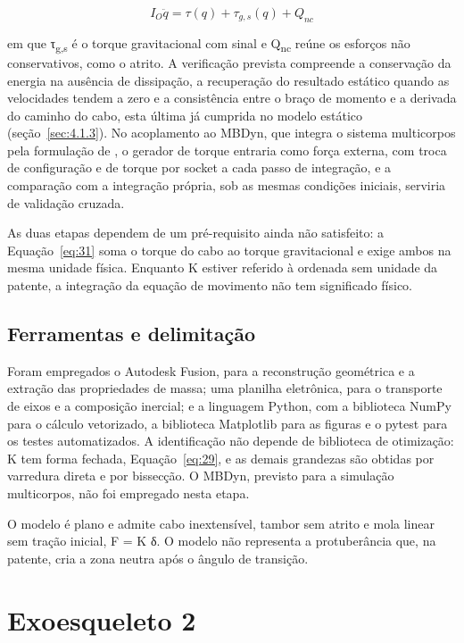 \begin{equation}
  I_{O}\ddot{q} = \tau(q) + \tau_{g,s}(q) + Q_{nc}
  \label{eq:31}
\end{equation}

em que τ\textsubscript{g,s} é o torque gravitacional com sinal e Q\textsubscript{nc} reúne os esforços não conservativos, como o atrito. A verificação prevista compreende a conservação da energia na ausência de dissipação, a recuperação do resultado estático quando as velocidades tendem a zero e a consistência entre o braço de momento e a derivada do caminho do cabo, esta última já cumprida no modelo estático (seção~\ref{sec:4.1.3}). No acoplamento ao MBDyn, que integra o sistema multicorpos pela formulação de \textcite{masarati2014}, o gerador de torque entraria como força externa, com troca de configuração e de torque por socket a cada passo de integração, e a comparação com a integração própria, sob as mesmas condições iniciais, serviria de validação cruzada.

As duas etapas dependem de um pré-requisito ainda não satisfeito: a Equação~\eqref{eq:31} soma o torque do cabo ao torque gravitacional e exige ambos na mesma unidade física. Enquanto K estiver referido à ordenada sem unidade da patente, a integração da equação de movimento não tem significado físico.

\subsection{Ferramentas e delimitação}\label{sec:3.1.14}

Foram empregados o Autodesk Fusion, para a reconstrução geométrica e a extração das propriedades de massa; uma planilha eletrônica, para o transporte de eixos e a composição inercial; e a linguagem Python, com a biblioteca NumPy \cite{harris2020} para o cálculo vetorizado, a biblioteca Matplotlib \cite{hunter2007} para as figuras e o pytest para os testes automatizados. A identificação não depende de biblioteca de otimização: K tem forma fechada, Equação~\eqref{eq:29}, e as demais grandezas são obtidas por varredura direta e por bissecção. O MBDyn, previsto para a simulação multicorpos, não foi empregado nesta etapa.

O modelo é plano e admite cabo inextensível, tambor sem atrito e mola linear sem tração inicial, F = K δ. O modelo não representa a protuberância que, na patente, cria a zona neutra após o ângulo de transição.

\section{Exoesqueleto 2}\label{sec:3.2}

